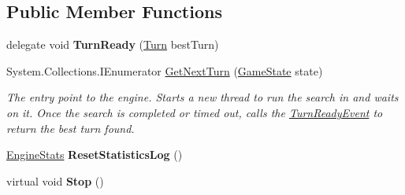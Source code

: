 \subsection*{Public Member Functions}
\begin{DoxyCompactItemize}
\item 
\hypertarget{class_universal_turn_based_a_i_1_1_turn_engine_adeb4bfc8a1cff70a60682d32243cc3a7}{}delegate void {\bfseries Turn\+Ready} (\hyperlink{class_universal_turn_based_a_i_1_1_turn}{Turn} best\+Turn)\label{class_universal_turn_based_a_i_1_1_turn_engine_adeb4bfc8a1cff70a60682d32243cc3a7}

\item 
System.\+Collections.\+I\+Enumerator \hyperlink{class_universal_turn_based_a_i_1_1_turn_engine_ae2a5b877b8194f05dc970226722515ee}{Get\+Next\+Turn} (\hyperlink{class_universal_turn_based_a_i_1_1_game_state}{Game\+State} state)
\begin{DoxyCompactList}\small\item\em The entry point to the engine. Starts a new thread to run the search in and waits on it. Once the search is completed or timed out, calls the \hyperlink{class_universal_turn_based_a_i_1_1_turn_engine_af10115494121382d2966a8fc9fe4c9a0}{Turn\+Ready\+Event} to return the best turn found. \end{DoxyCompactList}\item 
\hypertarget{class_universal_turn_based_a_i_1_1_turn_engine_a210fed5125af320ef0a9634305bca467}{}\hyperlink{class_universal_turn_based_a_i_1_1_engine_stats}{Engine\+Stats} {\bfseries Reset\+Statistics\+Log} ()\label{class_universal_turn_based_a_i_1_1_turn_engine_a210fed5125af320ef0a9634305bca467}

\item 
\hypertarget{class_universal_turn_based_a_i_1_1_turn_engine_a2a1210eb5816e1335f80d7a05efdafbf}{}virtual void {\bfseries Stop} ()\label{class_universal_turn_based_a_i_1_1_turn_engine_a2a1210eb5816e1335f80d7a05efdafbf}

\end{DoxyCompactItemize}

